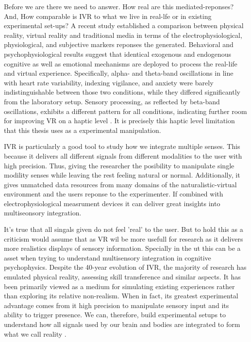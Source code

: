 \documentclass[12pt,oneside,openright]{report}
\begin{document}
Before we are there we need to answer. How real are this mediated-reponses? And, How comparable is IVR to  what we live in real-lfe or in existing experimental set-ups? A recent study established a comparison between physical reality, virtual reality and traditional media in terms of the electrophysiological, physiological, and subjective markers reponses the generated. Behavioral and psychophysiological results suggest that identical exogenous and endogenous cognitive as well as emotional mechanisms are deployed to process the real-life and virtual experience. Specifically, alpha- and theta-band oscillations in line with heart rate variability, indexing vigilance, and anxiety were barely indistinguishable between those two conditions, while they differed significantly from the laboratory setup. Sensory processing, as reflected by beta-band oscillations, exhibits a different pattern for all conditions, indicating further room for improving VR on a haptic level \parencite*{Schne2023TheRO}. It is precisely this haptic level limitation that this thesis uses as a experimental manipulation.  

IVR is particularly a good tool to study how we integrate multiple senses. This because it delivers all different signals from different modalities to the user with high precision. Thus, giving the researcher the posibility to manipulate single modility senses while leaving the rest feeling natural or normal. Additionally, it gives unmatched data resources from many domains of the naturalistic-virtual environment and the users reponse to the experimenter. If combined with electrophysiological measrument devices it can deliver great insights into multiseonsory integration. 

It's true that all singals given do not feel 'real' to the user. But to hold this as a criticism would assume that as VR wil be more usefull for research as it delivers more realistics displays of sensory information. Specially in the ut this can be a asset when trying to understand multisensory integration in cognitive psychophysics. Despite the 40-year evolution of IVR, the majority of research has emulated physical reality, assessing skill transference and similar aspects. It has been primarily viewed as a medium for simulating existing experiences rather than exploring its relative non-realism. When in fact, its greatest experimental advantage comes from it high precision to manipulate sensory input and its ability to trigger presence. We can, therefore, build experimental setups to understand how all signals used by our brain and bodies are integrated to form what we call reality \parencite{Vasser2020GuidelinesFI, deGelder2018VirtualRA}.
\end{document}
